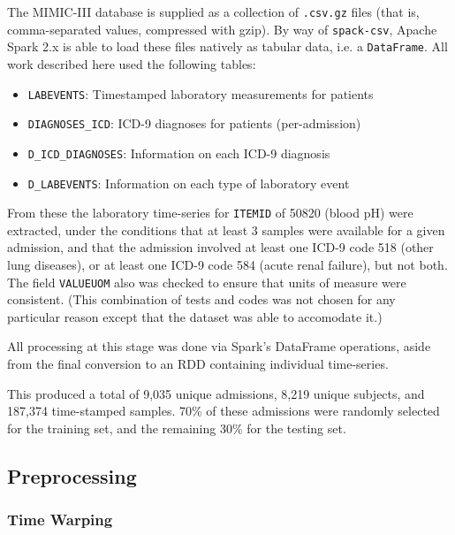 \documentclass[journal]{IEEEtran}
\begin{document}
The MIMIC-III database is supplied as a collection of \texttt{.csv.gz}
files (that is, comma-separated values, compressed with gzip).  By way
of \texttt{spack-csv}, Apache Spark 2.x is able to load these files
natively as tabular data, i.e. a \texttt{DataFrame}.  All work
described here used the following tables\cite{Johnson2016a}:

\begin{itemize}
\item \texttt{LABEVENTS}: Timestamped laboratory measurements for patients
\item \texttt{DIAGNOSES\_ICD}: ICD-9 diagnoses for patients (per-admission)
\item \texttt{D\_ICD\_DIAGNOSES}: Information on each ICD-9 diagnosis
\item \texttt{D\_LABEVENTS}: Information on each type of laboratory event
\end{itemize}


From these the laboratory time-series for \texttt{ITEMID} of 50820
(blood pH) were extracted, under the conditions that at least 3
samples were available for a given admission, and that the admission
involved at least one ICD-9 code 518 (other lung diseases), or at
least one ICD-9 code 584 (acute renal failure), but not both.  The
field \texttt{VALUEUOM} also was checked to ensure that units of
measure were consistent.  (This combination of tests and codes was not
chosen for any particular reason except that the dataset was able to
accomodate it.)

All processing at this stage was done via Spark's DataFrame
operations, aside from the final conversion to an RDD containing
individual time-series.

This produced a total of 9,035 unique admissions, 8,219 unique
subjects, and 187,374 time-stamped samples.  70\% of these admissions
were randomly selected for the training set, and the remaining 30\%
for the testing set.

\subsection{Preprocessing}

\subsubsection{Time Warping}
\end{document}
